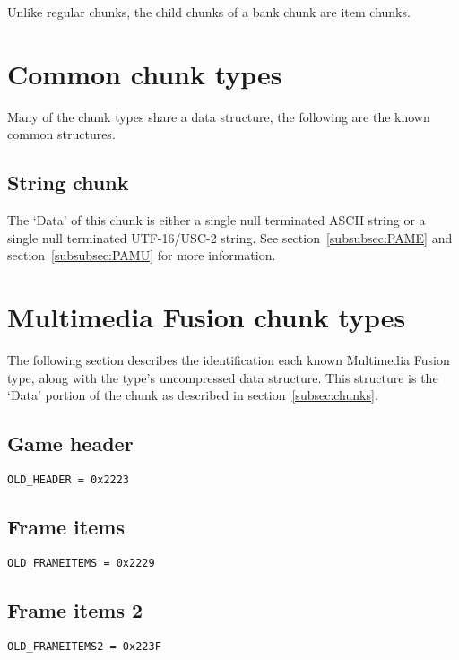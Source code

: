 \documentclass{article}
\begin{document}
Unlike regular chunks, the child chunks of a bank chunk are item chunks.


\section[Common chunks]{Common chunk types}
\label{sec:common-chunks}

Many of the chunk types share a data structure, the following are the known
common structures.

\subsection[String chunk]{String chunk}
\label{subsec:string-chunk}

The `Data' of this chunk is either a single null terminated ASCII string or
a single null terminated UTF-16/USC-2 string.
See section~\ref{subsubsec:PAME} and section~\ref{subsubsec:PAMU} for more
information.


\section[MMF chunks]{Multimedia Fusion chunk types}
\label{sec:mmf-chunks}

The following section describes the identification each known Multimedia
Fusion type, along with the type's uncompressed data structure.
This structure is the `Data' portion of the chunk as described in
section~\ref{subsec:chunks}.

\subsection{Game header}
\verb|OLD_HEADER = 0x2223|

\subsection{Frame items}
\verb|OLD_FRAMEITEMS = 0x2229|

\subsection{Frame items 2}
\verb|OLD_FRAMEITEMS2 = 0x223F|
\end{document}
